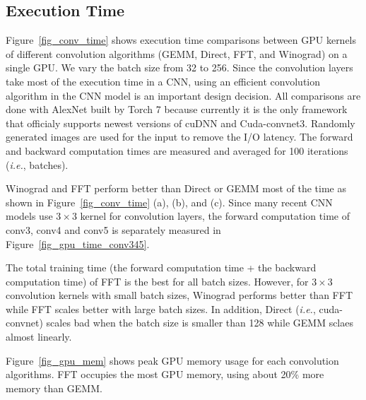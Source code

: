 \subsection{Execution Time}
Figure~\ref{fig_conv_time} shows execution time comparisons between GPU kernels of different convolution algorithms (\textsf{GEMM}, \textsf{Direct}, \textsf{FFT}, and \textsf{Winograd}) on a single GPU. We vary the batch size from 32 to 256. Since the convolution layers take most of the execution time in a CNN, using an efficient convolution algorithm in the CNN model is an important design decision. All comparisons are done with AlexNet built by Torch 7 because currently it is the only framework that officialy supports newest versions of cuDNN and Cuda-convnet3. Randomly generated images are used for the input to remove the I/O latency. The forward and backward computation times are measured and averaged for 100 iterations (\textit{i.e.}, batches). 

\textsf{Winograd} and \textsf{FFT} perform better than \textsf{Direct} or \textsf{GEMM} most of the time as shown in Figure~\ref{fig_conv_time} (a), (b), and (c). Since many recent CNN models use $3 \times 3$ kernel for convolution layers\cite{vgg}, the forward computation time of \textsf{conv3},  \textsf{conv4} and \textsf{conv5} is separately measured in Figure~\ref{fig_gpu_time_conv345}.

The total training time (the forward computation time + the backward computation time) of \textsf{FFT} is the best for all batch sizes. However, for $3 \times 3$ convolution kernels with small batch sizes, \textsf{Winograd} performs better than \textsf{FFT} while \textsf{FFT} scales better with large batch sizes. In addition, \textsf{Direct} (\textit{i.e.}, cuda-convnet) scales bad when the batch size is smaller than 128 while \textsf{GEMM} sclaes almost linearly.

Figure~\ref{fig_gpu_mem} shows peak GPU memory usage for each convolution algorithms. \textsf{FFT} occupies the most GPU memory, using about 20\% more memory than \textsf{GEMM}. 

